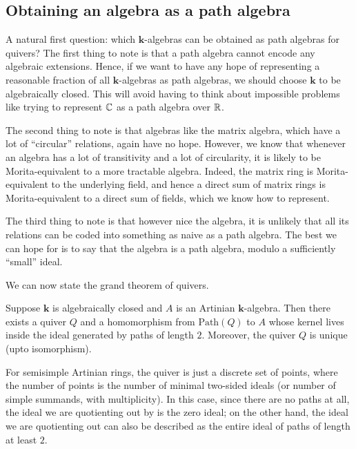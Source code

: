 \documentclass[a4paper]{amsart}
\newcommand{\field}{\mathbf{k}}
\newcommand{\pathalgebra}[1]{\text{Path}\left(#1\right)}
\begin{document}
\subsection{Obtaining an algebra as a path algebra}

A natural first question: which $\field$-algebras can be obtained as
path algebras for quivers? The first thing to note is that a path
algebra cannot encode any algebraic extensions. Hence, if we want to
have any hope of representing a reasonable fraction of all
$\field$-algebras as path algebras, we should choose $\field$ to be
algebraically closed. This will avoid having to think about impossible
problems like trying to represent $\mathbb{C}$ as a path algebra over $\mathbb{R}$.

The second thing to note is that algebras like the matrix algebra,
which have a lot of ``circular'' relations, again have no
hope. However, we know that whenever an algebra has a lot of
transitivity and a lot of circularity, it is likely to be
Morita-equivalent to a more tractable algebra. Indeed, the matrix ring
is Morita-equivalent to the underlying field, and hence a direct sum
of matrix rings is Morita-equivalent to a direct sum of fields, which
we know how to represent.

The third thing to note is that however nice the algebra, it is
unlikely that all its relations can be coded into something as naive
as a path algebra. The best we can hope for is to say that the algebra
is a path algebra, modulo a sufficiently ``small'' ideal.

We can now state the grand theorem of quivers.

\begin{theorem}
  Suppose $\field$ is algebraically closed and $A$ is an Artinian
  $\field$-algebra. Then there exists a quiver $Q$ and a homomorphism
  from $\pathalgebra{Q}$ to $A$ whose kernel lives inside the ideal generated
  by paths of length $2$. Moreover, the quiver $Q$ is unique (upto
  isomorphism).
\end{theorem}

For semisimple Artinian rings, the quiver is just a discrete set of
points, where the number of points is the number of minimal two-sided
ideals (or number of simple summands, with multiplicity). In this
case, since there are no paths at all, the ideal we are quotienting
out by is the zero ideal; on the other hand, the ideal we are
quotienting out can also be described as the entire ideal of paths of
length at least $2$.
\end{document}
